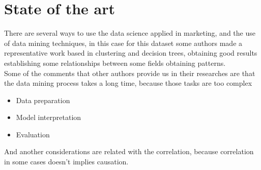 \section{State of the art} 
 There are several ways to use the data science applied in marketing, and the use of data mining techniques, in this case for this dataset some authors made a representative work based in clustering and decision trees, obtaining good results establishing some relationships between some fields obtaining patterns.\\
 Some of the comments that other authors provide us in their researches are that the data mining process takes a long time, because those tasks are too complex
 \begin{itemize}
  \item{Data preparation} 
  \item{Model interpretation}
  \item{Evaluation}
 \end{itemize}
 And another considerations are related with the correlation, because correlation in some cases doesn't implies causation.
 